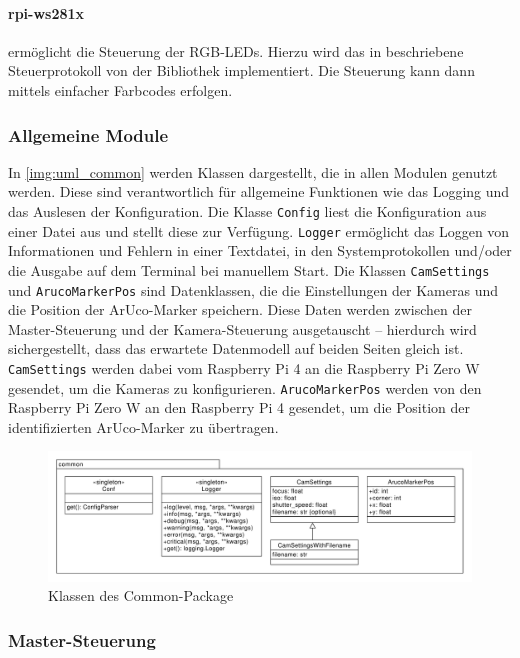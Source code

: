 \documentclass[./00PhotoBox.tex]{subfiles}
\begin{document}
\paragraph{rpi-ws281x}
\label{p:ws281x}
ermöglicht die Steuerung der RGB-LEDs. Hierzu wird das in \citet{ws2811} beschriebene Steuerprotokoll von der Bibliothek implementiert. Die Steuerung kann dann mittels einfacher Farbcodes erfolgen.

\subsubsection{Allgemeine Module}
In \autoref{img:uml_common} werden Klassen dargestellt, die in allen Modulen genutzt werden. Diese sind verantwortlich für allgemeine Funktionen wie das Logging und das Auslesen der Konfiguration. Die Klasse \texttt{Config} liest die Konfiguration aus einer Datei aus und stellt diese zur Verfügung. \texttt{Logger} ermöglicht das Loggen von Informationen und Fehlern in einer Textdatei, in den Systemprotokollen und/oder die Ausgabe auf dem Terminal bei manuellem Start. Die Klassen \texttt{CamSettings} und \texttt{ArucoMarkerPos} sind Datenklassen, die die Einstellungen der Kameras und die Position der ArUco-Marker speichern. Diese Daten werden zwischen der Master-Steuerung und der Kamera-Steuerung ausgetauscht -- hierdurch wird sichergestellt, dass das erwartete Datenmodell auf beiden Seiten gleich ist. \texttt{CamSettings} werden dabei vom Raspberry Pi 4 an die Raspberry Pi Zero W gesendet, um die Kameras zu konfigurieren. \texttt{ArucoMarkerPos} werden von den Raspberry Pi Zero W an den Raspberry Pi 4 gesendet, um die Position der identifizierten ArUco-Marker zu übertragen.

\begin{figure}
    \centering
    \includegraphics[width=1\textwidth]{./img/uml/uml_common_classdiagramm.pdf}
    \caption{Klassen des Common-Package}
    \label{img:uml_common}
\end{figure}


\subsubsection{Master-Steuerung}
\end{document}
